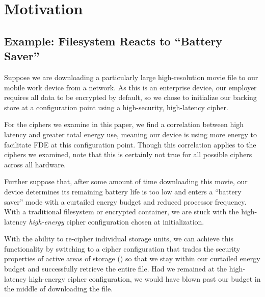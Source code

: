 \section{Motivation}\label{sec:motivation}

\subsection{Example: Filesystem Reacts to ``Battery Saver''}


Suppose we are downloading a particularly large high-resolution movie file to
our mobile work device from a network. As this is an enterprise device, our
employer requires all data to be encrypted by default,
so we chose to initialize our backing store at a configuration point using a
high-security, high-latency cipher.

For the ciphers we examine in this paper, we find a correlation between high
latency and greater total energy use, meaning our device is using more
energy to facilitate FDE at this configuration point. Though this correlation
applies to the ciphers we examined, note that this is certainly not true for all
possible ciphers across all hardware.

Further suppose that, after some amount of time downloading this movie, our
device determines its remaining battery life is too low and enters a ``battery
saver'' mode with a curtailed energy budget and reduced processor frequency.
With a traditional filesystem or encrypted container, we are stuck with the
high-latency \emph{high-energy} cipher configuration chosen at initialization.

With the ability to re-cipher individual storage units, we can achieve this
functionality by switching to a cipher configuration that trades the security
properties of active areas of storage () so that we stay within our
curtailed energy budget and successfully retrieve the entire file. Had we
remained at the high-latency high-energy cipher configuration, we would have
blown past our budget in the middle of downloading the file.

